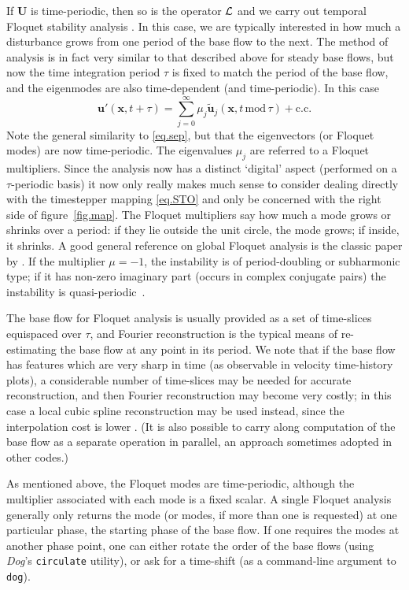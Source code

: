 \documentclass[11pt,a4paper]{report}
\newcommand\wt[1]{\widetilde{#1}}
\newcommand\qp{qua\-si-per\-io\-dic}
\newcommand\Ubase{{\bm{U}}}
\newcommand\upert{{\bm{u}'}}
\newcommand\xvec{\bm{x}}
\newcommand\Lop{{\cal L}}
\newcommand{\Dog}{\emph{Dog}}
\begin{document}
If $\Ubase$ is time-periodic, then so is the operator $\Lop$ and we
carry out temporal Floquet stability analysis \citep[analysis of a
  linear system of ODEs/PDEs where the coefficients are time-periodic,
  see e.g.][]{iooss90}. In this case, we are typically interested in
how much a disturbance grows from one period of the base flow to the
next.  The method of analysis is in fact very similar to that
described above for steady base flows, but now the time integration
period $\tau$ is fixed to match the period of the base flow, and the
eigenmodes are also time-dependent (and time-periodic).  In this case
\begin{equation}
\upert(\xvec, t+\tau) = \sum_{j=0}^\infty
\mu_j\wt{\bm{u}}_j(\xvec,t\,\textrm{mod}\,\tau) +\text{c.c.}
\label{eq.flok}
\end{equation}
Note the general similarity to \eqref{eq.sep}, but that the
eigenvectors (or Floquet modes) are now time-periodic.  The
eigenvalues $\mu_j$ are referred to a Floquet multipliers.  Since the
analysis now has a distinct `digital' aspect (performed on a
$\tau$-periodic basis) it now only really makes much sense to consider
dealing directly with the timestepper mapping \eqref{eq.STO} and only
be concerned with the right side of figure~\ref{fig.map}.  The Floquet
multipliers say how much a mode grows or shrinks over a period: if
they lie outside the unit circle, the mode grows; if inside, it
shrinks.  A good general reference on global Floquet analysis is the
classic paper by \citet{bah96}.  If the multiplier $\mu=-1$, the
instability is of period-doubling or subharmonic type; if it has
non-zero imaginary part (occurs in complex conjugate pairs) the
instability is \qp\ \citep{bllo03b}.

The base flow for Floquet analysis is usually provided as a set of
time-slices equispaced over $\tau$, and Fourier reconstruction is the
typical means of re-estimating the base flow at any point in its
period.  We note that if the base flow has features which are very
sharp in time (as observable in velocity time-history plots), a
considerable number of time-slices may be needed for accurate
reconstruction, and then Fourier reconstruction may become very
costly; in this case a local cubic spline reconstruction may be used
instead, since the interpolation cost is lower \citep{msb11}.
%
(It is also possible to carry along computation of the base flow as a
separate operation in parallel, an approach sometimes adopted in other
codes.)

As mentioned above, the Floquet modes are time-periodic, although the
multiplier associated with each mode is a fixed scalar.  A single
Floquet analysis generally only returns the mode (or modes, if more
than one is requested) at one particular phase, the starting phase of
the base flow. If one requires the modes at another phase point, one
can either rotate the order of the base flows (using \Dog's
\verb+circulate+ utility), or ask for a time-shift (as a command-line
argument to \verb+dog+).
\end{document}
